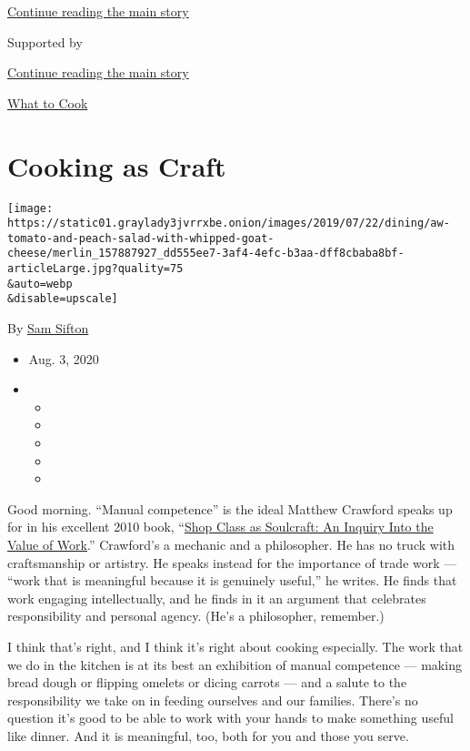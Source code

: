 \protect\hyperlink{after-top}{Continue reading the main story}

Supported by

\protect\hyperlink{after-sponsor}{Continue reading the main story}

\href{/column/what-to-cook}{What to Cook}

\hypertarget{cooking-as-craft}{%
\section{Cooking as Craft}\label{cooking-as-craft}}

\texttt{[image: https://static01.graylady3jvrrxbe.onion/images/2019/07/22/dining/aw-tomato-and-peach-salad-with-whipped-goat-cheese/merlin\_157887927\_dd555ee7-3af4-4efc-b3aa-dff8cbaba8bf-articleLarge.jpg?quality=75\\\&auto=webp\\\&disable=upscale]}

By \href{https://www.nytimes3xbfgragh.onion/by/sam-sifton}{Sam Sifton}

\begin{itemize}
\item
  Aug. 3, 2020
\item
  \begin{itemize}
  \item
  \item
  \item
  \item
  \item
  \end{itemize}
\end{itemize}

Good morning. ``Manual competence'' is the ideal Matthew Crawford speaks
up for in his excellent 2010 book,
``\href{https://www.penguinrandomhouse.com/books/301618/shop-class-as-soulcraft-by-matthew-b-crawford/}{Shop
Class as Soulcraft: An Inquiry Into the Value of Work}.'' Crawford's a
mechanic and a philosopher. He has no truck with craftsmanship or
artistry. He speaks instead for the importance of trade work --- ``work
that is meaningful because it is genuinely useful,'' he writes. He finds
that work engaging intellectually, and he finds in it an argument that
celebrates responsibility and personal agency. (He's a philosopher,
remember.)

I think that's right, and I think it's right about cooking especially.
The work that we do in the kitchen is at its best an exhibition of
manual competence --- making bread dough or flipping omelets or dicing
carrots --- and a salute to the responsibility we take on in feeding
ourselves and our families. There's no question it's good to be able to
work with your hands to make something useful like dinner. And it is
meaningful, too, both for you and those you serve.

